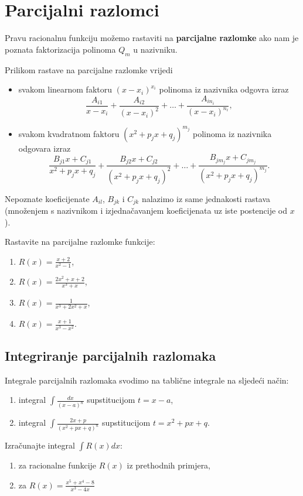 
\section{Parcijalni razlomci}

Pravu racionalnu funkciju možemo rastaviti na \textbf{parcijalne razlomke} ako
nam je poznata faktorizacija polinoma $Q_m$ u nazivniku.

Prilikom rastave na parcijalne razlomke vrijedi
\begin{itemize}
    \item svakom linearnom faktoru $(x-x_i)^{x_i}$ polinoma iz nazivnika odgovra
    izraz
    $$
      \frac{A_{i1}}{x-x_i} + \frac{A_{i2}}{(x-x_i)^2} + \dots + \frac{A_{in_i}}{(x-x_i)^{n_i}},
    $$
    \item svakom kvadratnom faktoru $(x^2+p_jx+q_j)^{m_j}$ polinoma iz nazivnika
    odgovara izraz
    $$
      \frac{B_{j1}x+C_{j1}}{x^2+p_jx+q_j} + \frac{B_{j2}x+C_{j2}}{(x^2+p_jx+q_j)^2} + \dots + \frac{B_{jm_j}x+C_{jm_j}}{(x^2+p_jx+q_j)^{m_j}}.
    $$
\end{itemize}

Nepoznate koeficijenate $A_{il}$, $B_{jk}$ i $C_{jk}$ nalazimo iz same
jednakosti rastava (množenjem s nazivnikom i izjednačavanjem koeficijenata uz
iste postencije od $x$).

\begin{example}
    Rastavite na parcijalne razlomke funkcije:
    \begin{enumerate}
        \item $R(x)=\frac{x+2}{x^2-1}$,
        \item $R(x)=\frac{2x^2+x+2}{x^3+x}$,
        \item $R(x)=\frac{1}{x^3+2x^2+x}$,
        \item $R(x)=\frac{x+1}{x^3-x^2}$.
    \end{enumerate}
\end{example}

\subsection{Integriranje parcijalnih razlomaka}

Integrale parcijalnih razlomaka svodimo na tablične integrale na sljedeći način:

\begin{enumerate}
    \item integral $\int \frac{dx}{(x-a)^n}$ supstitucijom $t=x-a$,
    \item integral $\int \frac{2x+p}{(x^2+px+q)^n}$ supstitucijom $t=x^2+px+q$.
\end{enumerate}

\begin{example}
    Izračunajte integral $\int R(x) dx$:
    \begin{enumerate}
        \item za racionalne funkcije $R(x)$ iz prethodnih primjera,
        \item za $R(x) = \frac{x^5+x^4-8}{x^3-4x}$
    \end{enumerate}
\end{example}
